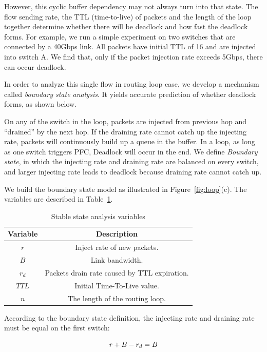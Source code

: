 However, this cyclic buffer dependency may not always turn into that state. The flow
sending rate, the TTL (time-to-live) of packets and the length of the loop together 
determine whether there will be deadlock and how fast the deadlock forms. 
For example, we run a simple experiment on two switches that are connected by a 
40Gbps link. All packets have initial TTL of 16 and are injected into switch A. We find that, 
only if the packet injection rate exceeds 5Gbps, there can occur deadlock. 

In order to analyze this single flow in routing loop case, we develop a mechanism called 
{\em boundary state analysis}. It yields accurate prediction of whether deadlock forms,
as shown below.

On any of the switch in the loop, packets are injected from previous hop and ``drained'' by the next hop. If the draining
rate cannot catch up the injecting rate, packets will continuously build up a queue in the
buffer. In a loop, as long as one switch triggers PFC, Deadlock will occur in the end. 
We define {\em Boundary state}, in which the injecting rate and draining rate are balanced on every
switch, and larger injecting rate leads to deadlock because draining rate cannot catch up.

We build the boundary state model as illustrated in 
Figure~\ref{fig:loop}(c). The variables are described in Table~\ref{tab:stable_state}.


\begin{table}[h]
\centering
\caption{\small Stable state analysis variables}
\label{tab:stable_state}
{\small
\begin{tabular}{|c|c|}
 \hline
Variable &  Description \\
\hline
$r$ & Inject rate of new packets. \\
\hline
$B$ & Link bandwidth. \\
\hline
$r_d$ & Packets drain rate caused by TTL expiration. \\
\hline
$TTL$ & Initial Time-To-Live value. \\
\hline
$n$ & The length of the routing loop. \\
\hline
\end{tabular}
}
\end{table}

According to the boundary state definition, the injecting rate and draining rate
must be equal on the first switch:

\begin{equation}
\small
r + B - r_d = B
\label{eq:rate}
\end{equation}

